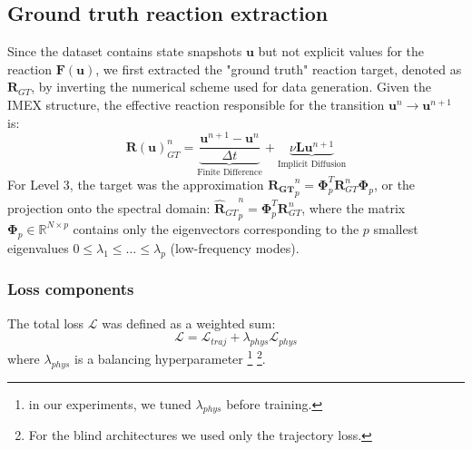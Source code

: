 \subsection{Ground truth reaction extraction}
Since the dataset contains state snapshots $\mathbf{u}$ but not explicit values for the reaction $\mathbf{F}(\mathbf{u})$, we first extracted the "ground truth" reaction target, denoted as $\mathbf{R}_{GT}$, by inverting the numerical scheme used for data generation.
Given the IMEX structure, the effective reaction responsible for the transition $\mathbf{u}^n \to \mathbf{u}^{n+1}$ is:
\begin{equation}
    \mathbf{R(u)}_{GT}^n = \underbrace{\frac{\mathbf{u}^{n+1} - \mathbf{u}^n}{\Delta t}}_{\text{Finite Difference}} + \underbrace{\nu \mathbf{L} \mathbf{u}^{n+1}}_{\text{Implicit Diffusion}}
\end{equation}
For Level 3, the target was the approximation $\mathbf{{R}_{GT}}^{n}_{p} = \mathbf{\Phi}_p^T \mathbf{R}_{GT}^n \mathbf{\Phi}_p$, or the projection onto the spectral domain: ${\hat{\mathbf{R}}_{GT}}^{n}_{p} = \mathbf{\Phi}_p^T \mathbf{R}_{GT}^n$, where the matrix $\mathbf{\Phi}_p \in \mathbb{R}^{N \times p}$ contains only the eigenvectors corresponding to the $p$ smallest eigenvalues $0 \le \lambda_1 \le \dots \le \lambda_p$ (low-frequency modes).

\subsubsection{Loss components}
The total loss $\mathcal{L}$ was defined as a weighted sum:
\begin{equation}
    \mathcal{L} = \mathcal{L}_{traj} + \lambda_{phys} \mathcal{L}_{phys}
\end{equation}
where $\lambda_{phys}$ is a balancing hyperparameter \footnote{in our experiments, we tuned $\lambda_{phys}$ before training.}
\footnote{For the blind architectures we used only the trajectory loss.}.

